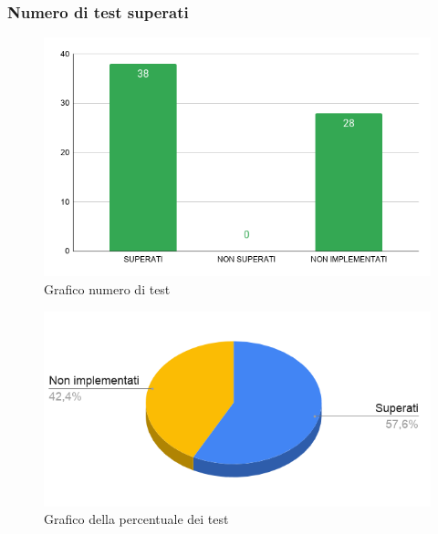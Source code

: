 \subsubsection{Numero di test superati}

    \begin{figure}[H]
        \centering
        \includegraphics[width=10 cm]{source/sections/images/num-test.png}
        \caption{Grafico numero di test}
    \end{figure}

    \begin{figure}[H]
        \centering
        \includegraphics[width=10 cm]{source/sections/images/torta-test.png}
        \caption{Grafico della percentuale dei test}
    \end{figure}